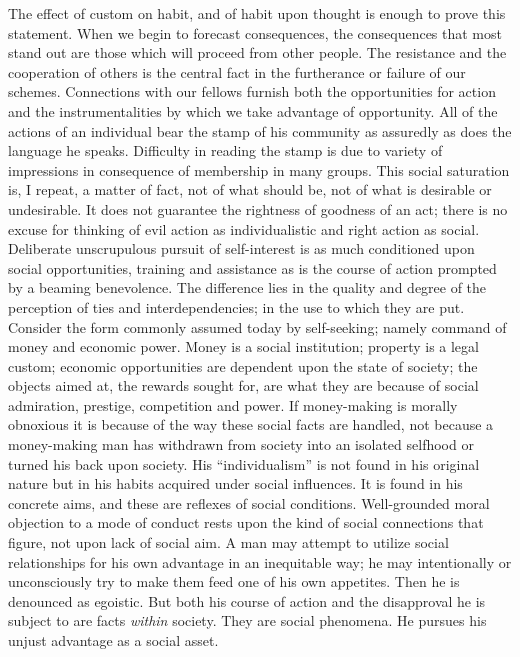 The effect of custom on habit, and of habit upon thought is enough to
prove this statement. When we  begin to forecast
consequences, the consequences that most stand out are those which
will proceed from other people. The resistance and the cooperation of
others is the central fact in the furtherance or failure of our
schemes. Connections with our fellows furnish both the opportunities
for action and the instrumentalities by which we take advantage of
opportunity. All of the actions of an individual bear the stamp of his
community as assuredly as does the language he speaks. Difficulty in
reading the stamp is due to variety of impressions in consequence of
membership in many groups. This social saturation is, I repeat, a
matter of fact, not of what should be, not of what is desirable or
undesirable. It does not guarantee the rightness of goodness of an
act; there is no excuse for thinking of evil action as individualistic
and right action as social. Deliberate unscrupulous pursuit of
self-interest is as much conditioned upon social opportunities,
training and assistance as is the course of action prompted by a
beaming benevolence. The difference lies in the quality and degree
of the perception of ties and interdependencies; in the use to which
they are put. Consider the form commonly assumed today by
self-seeking; namely command of money and economic power. Money is a
social institution; property is a legal custom; economic opportunities
are dependent upon the state of society; the objects aimed at, the
rewards sought for, are what they are because of social admiration,
prestige, competition and power. If money-making is morally obnoxious
it is because of the way these  social facts are handled,
not because a money-making man has withdrawn from society into an
isolated selfhood or turned his back upon society. His
``individualism'' is not found in his original nature but in his
habits acquired under social influences. It is found in his concrete
aims, and these are reflexes of social conditions. Well-grounded
moral objection to a mode of conduct rests upon the kind of social
connections that figure, not upon lack of social aim. A man may
attempt to utilize social relationships for his own advantage in an
inequitable way; he may intentionally or unconsciously try to make
them feed one of his own appetites. Then he is denounced as egoistic.
But both his course of action and the disapproval he is subject to are
facts \textit{within} society. They are social phenomena. He pursues
his unjust advantage as a social asset.

